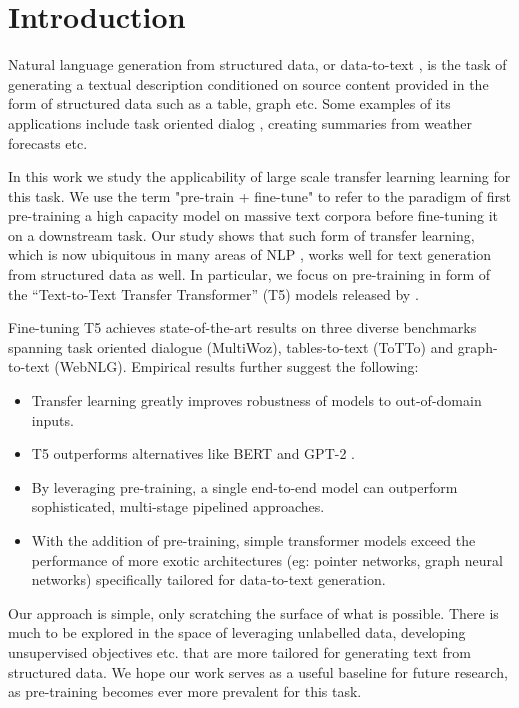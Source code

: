 \documentclass[11pt,a4paper]{article}
\begin{document}
\section{Introduction}
Natural language generation from structured data, or data-to-text \cite{kukich1983design,mckeown1985text}, is the task of generating a textual description conditioned on source content provided in the form of structured data such as a table, graph etc. Some examples of its applications include task oriented dialog \cite{wen2015semantically}, creating summaries from weather forecasts \cite{sripada2003sumtime} etc.
\par In this work we study the applicability of large scale transfer learning learning for this task. We use the term "pre-train + fine-tune" to refer to the paradigm of first pre-training a high capacity model on massive text corpora before fine-tuning it on a downstream task. Our study shows that such form of transfer learning, which is now ubiquitous in many areas of NLP \cite{devlin2018bert}, works well for text generation from structured data as well. In particular, we focus on pre-training in form of the “Text-to-Text Transfer Transformer” (T5) models released by \citet{raffel2019exploring}.
\par Fine-tuning T5 achieves state-of-the-art results on three diverse benchmarks spanning task oriented dialogue (MultiWoz), tables-to-text (ToTTo) and graph-to-text (WebNLG). Empirical results further suggest the following:
\begin{itemize}
    \item Transfer learning greatly improves robustness of models to out-of-domain inputs.
    \item T5 outperforms alternatives like BERT \cite{devlin2018bert} and GPT-2 \cite{radford2019language}.
    \item By leveraging pre-training, a single end-to-end model can outperform sophisticated, multi-stage pipelined approaches.
    \item With the addition of pre-training, simple transformer \cite{vaswani2017attention} models exceed the performance of more exotic architectures (eg: pointer networks, graph neural networks) specifically tailored for data-to-text generation.
\end{itemize}
\par Our approach is simple, only scratching the surface of what is possible. There is much to be explored in the space of leveraging unlabelled data, developing unsupervised objectives etc. that are more tailored for generating text from structured data. We hope our work serves as a useful baseline for future research, as pre-training becomes ever more prevalent for this task. 
\end{document}

